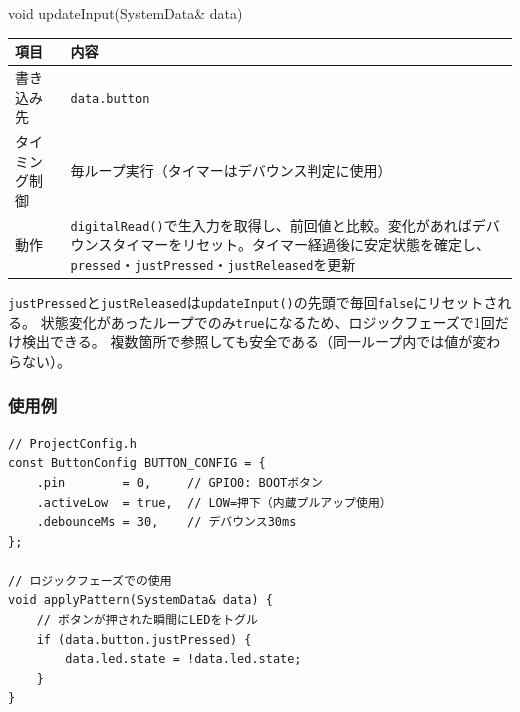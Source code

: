 \begin{funcblock}{void updateInput(SystemData\& data)}
\begin{tabularx}{\textwidth}{l X}
\toprule
\textbf{項目} & \textbf{内容} \\
\midrule
書き込み先     & \texttt{data.button} \\
タイミング制御 & 毎ループ実行（タイマーはデバウンス判定に使用） \\
動作           & \texttt{digitalRead()}で生入力を取得し、前回値と比較。変化があればデバウンスタイマーをリセット。タイマー経過後に安定状態を確定し、\texttt{pressed}・\texttt{justPressed}・\texttt{justReleased}を更新 \\
\bottomrule
\end{tabularx}
\end{funcblock}

\begin{notebox}[エッジフラグのライフサイクル]
\texttt{justPressed}と\texttt{justReleased}は\texttt{updateInput()}の先頭で毎回\texttt{false}にリセットされる。
状態変化があったループでのみ\texttt{true}になるため、ロジックフェーズで1回だけ検出できる。
複数箇所で参照しても安全である（同一ループ内では値が変わらない）。
\end{notebox}

\subsubsection{使用例}

\begin{lstlisting}[style=cppstyle, caption={ButtonModuleの使用例}]
// ProjectConfig.h
const ButtonConfig BUTTON_CONFIG = {
    .pin        = 0,     // GPIO0: BOOTボタン
    .activeLow  = true,  // LOW=押下（内蔵プルアップ使用）
    .debounceMs = 30,    // デバウンス30ms
};

// ロジックフェーズでの使用
void applyPattern(SystemData& data) {
    // ボタンが押された瞬間にLEDをトグル
    if (data.button.justPressed) {
        data.led.state = !data.led.state;
    }
}
\end{lstlisting}
